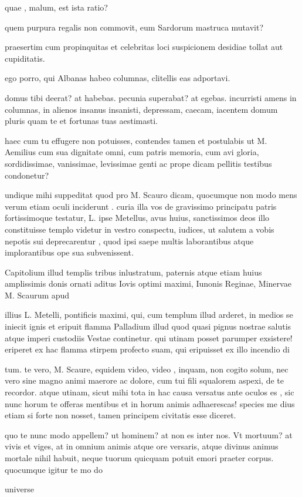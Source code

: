  quae , malum, est ista ratio?

 quem purpura regalis non commovit, eum Sardorum mastruca mutavit?

 praesertim cum propinquitas et celebritas loci suspicionem desidiae tollat aut cupiditatis.

 ego porro, qui Albanas habeo columnas, clitellis eas adportavi.

 domus tibi deerat? at habebas. pecunia superabat? at egebas. incurristi amens in columnas, in alienos insanus insanisti, depressam, caecam, iacentem domum pluris quam te et fortunas tuas aestimasti.

 haec cum tu effugere non potuisses, contendes tamen et postulabis ut M. Aemilius cum sua dignitate omni, cum patris memoria, cum avi gloria, sordidissimae, vanissimae, levissimae genti ac prope dicam pellitis testibus condonetur?

 undique mihi suppeditat quod pro M. Scauro dicam, quocumque non modo mens verum etiam oculi inciderunt . curia illa vos de gravissimo principatu patris fortissimoque testatur, L. ipse Metellus, avus huius, sanctissimos deos illo constituisse templo videtur in vestro conspectu, iudices, ut salutem a vobis nepotis sui deprecarentur , quod ipsi saepe multis laborantibus atque implorantibus ope sua subvenissent.

 Capitolium illud templis tribus inlustratum, paternis atque etiam huius amplissimis donis ornati aditus Iovis optimi maximi, Iunonis Reginae, Minervae M. Scaurum apud

 illius L. Metelli, pontificis maximi, qui, cum templum illud arderet, in medios se iniecit ignis et eripuit flamma Palladium illud quod quasi pignus nostrae salutis atque imperi custodiis Vestae continetur. qui utinam posset parumper exsistere! eriperet ex hac flamma stirpem profecto suam, qui eripuisset ex illo incendio di

 tum. te vero, M. Scaure, equidem video, video , inquam, non cogito solum, nec vero sine magno animi maerore ac dolore, cum tui fili squalorem aspexi, de te recordor. atque utinam, sicut mihi tota in hac causa versatus ante oculos es , sic nunc horum te offeras mentibus et in horum animis adhaerescas! species me dius etiam si forte non nosset, tamen principem civitatis esse diceret.

 quo te nunc modo appellem? ut hominem? at non es inter nos. Vt mortuum? at vivis et viges, at in omnium animis atque ore versaris, atque divinus animus mortale nihil habuit, neque tuorum quicquam potuit emori praeter corpus. quocumque igitur te mo do

 universe
